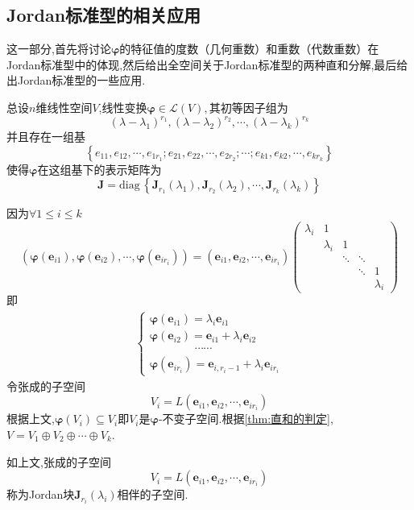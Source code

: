 \subsection{Jordan标准型的相关应用}
这一部分,首先将讨论$\bm{\varphi}$的特征值的度数（几何重数）和重数（代数重数）在Jordan标准型中的体现,然后给出全空间关于Jordan标准型的两种直和分解,最后给出Jordan标准型的一些应用.
\begin{red}
\begin{remark}
    总设$n$维线性空间$V$,线性变换$\bm{\varphi}\in \mathcal{L}\left(V\right),$其初等因子组为\[
    \left(\lambda-\lambda_1\right)^{r_1},\left(\lambda-\lambda_2\right)^{r_2},\cdots,\left(\lambda-\lambda_k\right)^{r_k}
    \]并且存在一组基\[
    \left\{
        e_{11},e_{12},\cdots,e_{1r_1};e_{21},e_{22},\cdots,e_{2r_2};\cdots;e_{k1},e_{k2},\cdots,e_{kr_k}
    \right\}
    \]使得$\bm{\varphi}$在这组基下的表示矩阵为\[
    \bm{J}= \mathrm{diag}\,\left\{
        \bm{J}_{r_1}\left(\lambda_1\right),\bm{J}_{r_2}\left(\lambda_2\right),\cdots,\bm{J}_{r_k}\left(\lambda_k\right)
    \right\}
    \]
\end{remark}
\end{red}因为$\forall 1\leqslant i\leqslant k$\[
    \left(
        \bm{\varphi}\left(\bm{e}_{i1}\right),\bm{\varphi}\left(\bm{e}_{i2}\right),\cdots,\bm{\varphi}\left(\bm{e}_{ir_i}\right)
    \right)=\left(
        \bm{e}_{i1},\bm{e}_{i2},\cdots,\bm{e}_{ir_i}
    \right)\begin{pmatrix}
        \lambda_i&1&&&\\
        &\lambda_i&1&\\
        &&\ddots&\ddots&\\
        &&&\ddots&1\\
        &&&&\lambda_i
    \end{pmatrix}
    \]即\begin{align*}
        \begin{cases*}
        \bm{\varphi}\left(\bm{e}_{i1}\right)=\lambda_i\bm{e}_{i1}\\
        \bm{\varphi}\left(\bm{e}_{i2}\right)=\bm{e}_{i1}+\lambda_i\bm{e}_{i2}\\
        \qquad\qquad\cdots\cdots\\
        \bm{\varphi}\left(\bm{e}_{ir_i}\right)=\bm{e}_{i,r_i-1}+\lambda_i\bm{e}_{ir_i}
        \end{cases*}\tag{$*$}
    \end{align*}令张成的子空间\[
    V_i=L\left(
        \bm{e}_{i1},\bm{e}_{i2},\cdots,\bm{e}_{ir_i}
    \right)
    \]根据上文,$\bm{\varphi}\left(V_i\right)\subseteq V_i$即$V_i$是$\bm{\varphi}$-不变子空间.根据\cref{thm:直和的判定},$V=V_1\oplus V_2\oplus\cdots\oplus V_k.$
    \begin{formal}
    \begin{definition}[Jordan块相伴的子空间]\label{def:Jordan块相伴的子空间}
        如上文,张成的子空间\[
        V_i=L\left(
            \bm{e}_{i1},\bm{e}_{i2},\cdots,\bm{e}_{ir_i}
        \right)
        \]称为\textup{Jordan}块$\bm{J}_{r_i}\left(\lambda_i\right)$相伴的子空间.
    \end{definition}
    \end{formal}


